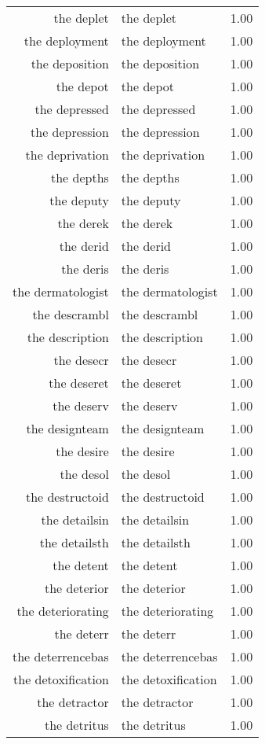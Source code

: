 \begin{table}[ht]
\begin{tabular}{rlr}
  the deplet & the deplet & 1.00 \\ 
  the deployment & the deployment & 1.00 \\ 
  the deposition & the deposition & 1.00 \\ 
  the depot & the depot & 1.00 \\ 
  the depressed & the depressed & 1.00 \\ 
  the depression & the depression & 1.00 \\ 
  the deprivation & the deprivation & 1.00 \\ 
  the depths & the depths & 1.00 \\ 
  the deputy & the deputy & 1.00 \\ 
  the derek & the derek & 1.00 \\ 
  the derid & the derid & 1.00 \\ 
  the deris & the deris & 1.00 \\ 
  the dermatologist & the dermatologist & 1.00 \\ 
  the descrambl & the descrambl & 1.00 \\ 
  the description & the description & 1.00 \\ 
  the desecr & the desecr & 1.00 \\ 
  the deseret & the deseret & 1.00 \\ 
  the deserv & the deserv & 1.00 \\ 
  the designteam & the designteam & 1.00 \\ 
  the desire & the desire & 1.00 \\ 
  the desol & the desol & 1.00 \\ 
  the destructoid & the destructoid & 1.00 \\ 
  the detailsin & the detailsin & 1.00 \\ 
  the detailsth & the detailsth & 1.00 \\ 
  the detent & the detent & 1.00 \\ 
  the deterior & the deterior & 1.00 \\ 
  the deteriorating & the deteriorating & 1.00 \\ 
  the deterr & the deterr & 1.00 \\ 
  the deterrencebas & the deterrencebas & 1.00 \\ 
  the detoxification & the detoxification & 1.00 \\ 
  the detractor & the detractor & 1.00 \\ 
  the detritus & the detritus & 1.00 \\ 

\end{tabular}
\end{table}
